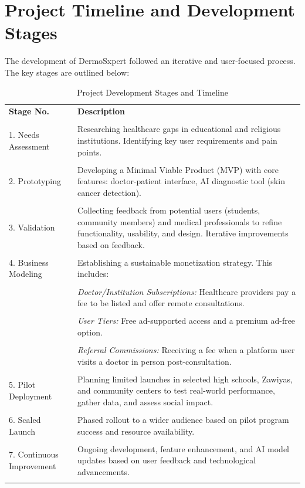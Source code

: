 \section{Project Timeline and Development Stages}
The development of DermoSxpert followed an iterative and user-focused process. The key stages are outlined below:

\begin{table}[H]
    \centering
    \caption{Project Development Stages and Timeline}
    \label{tab:project_timeline}
    \begin{tabularx}{\linewidth}{@{}lX@{}}
        \toprule
        \rowcolor{Gray}\textbf{Stage No.} & \textbf{Description} \\\\
        \midrule
        1. Needs Assessment & Researching healthcare gaps in educational and religious institutions. Identifying key user requirements and pain points. \\\\
        2. Prototyping & Developing a Minimal Viable Product (MVP) with core features: doctor-patient interface, AI diagnostic tool (skin cancer detection). \\\\
        3. Validation & Collecting feedback from potential users (students, community members) and medical professionals to refine functionality, usability, and design. Iterative improvements based on feedback. \\\\
        4. Business Modeling & Establishing a sustainable monetization strategy. This includes: \\\\
          & \textit{Doctor/Institution Subscriptions:} Healthcare providers pay a fee to be listed and offer remote consultations. \\\\
          & \textit{User Tiers:} Free ad-supported access and a premium ad-free option. \\\\
          & \textit{Referral Commissions:} Receiving a fee when a platform user visits a doctor in person post-consultation. \\\\
        5. Pilot Deployment & Planning limited launches in selected high schools, Zawiyas, and community centers to test real-world performance, gather data, and assess social impact. \\\\
        6. Scaled Launch & Phased rollout to a wider audience based on pilot program success and resource availability. \\\\
        7. Continuous Improvement & Ongoing development, feature enhancement, and AI model updates based on user feedback and technological advancements. \\\\
        \bottomrule
    \end{tabularx}
\end{table}

